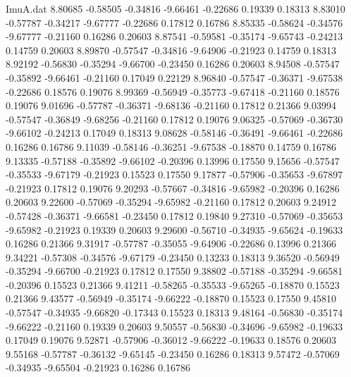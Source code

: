 \begin{filecontents}{ImuA.dat}
   8.80685   -0.58505   -0.34816   -9.66461   -0.22686    0.19339    0.18313
   8.83010   -0.57787   -0.34217   -9.67777   -0.22686    0.17812    0.16786
   8.85335   -0.58624   -0.34576   -9.67777   -0.21160    0.16286    0.20603
   8.87541   -0.59581   -0.35174   -9.65743   -0.24213    0.14759    0.20603
   8.89870   -0.57547   -0.34816   -9.64906   -0.21923    0.14759    0.18313
   8.92192   -0.56830   -0.35294   -9.66700   -0.23450    0.16286    0.20603
   8.94508   -0.57547   -0.35892   -9.66461   -0.21160    0.17049    0.22129
   8.96840   -0.57547   -0.36371   -9.67538   -0.22686    0.18576    0.19076
   8.99369   -0.56949   -0.35773   -9.67418   -0.21160    0.18576    0.19076
   9.01696   -0.57787   -0.36371   -9.68136   -0.21160    0.17812    0.21366
   9.03994   -0.57547   -0.36849   -9.68256   -0.21160    0.17812    0.19076
   9.06325   -0.57069   -0.36730   -9.66102   -0.24213    0.17049    0.18313
   9.08628   -0.58146   -0.36491   -9.66461   -0.22686    0.16286    0.16786
   9.11039   -0.58146   -0.36251   -9.67538   -0.18870    0.14759    0.16786
   9.13335   -0.57188   -0.35892   -9.66102   -0.20396    0.13996    0.17550
   9.15656   -0.57547   -0.35533   -9.67179   -0.21923    0.15523    0.17550
   9.17877   -0.57906   -0.35653   -9.67897   -0.21923    0.17812    0.19076
   9.20293   -0.57667   -0.34816   -9.65982   -0.20396    0.16286    0.20603
   9.22600   -0.57069   -0.35294   -9.65982   -0.21160    0.17812    0.20603
   9.24912   -0.57428   -0.36371   -9.66581   -0.23450    0.17812    0.19840
   9.27310   -0.57069   -0.35653   -9.65982   -0.21923    0.19339    0.20603
   9.29600   -0.56710   -0.34935   -9.65624   -0.19633    0.16286    0.21366
   9.31917   -0.57787   -0.35055   -9.64906   -0.22686    0.13996    0.21366
   9.34221   -0.57308   -0.34576   -9.67179   -0.23450    0.13233    0.18313
   9.36520   -0.56949   -0.35294   -9.66700   -0.21923    0.17812    0.17550
   9.38802   -0.57188   -0.35294   -9.66581   -0.20396    0.15523    0.21366
   9.41211   -0.58265   -0.35533   -9.65265   -0.18870    0.15523    0.21366
   9.43577   -0.56949   -0.35174   -9.66222   -0.18870    0.15523    0.17550
   9.45810   -0.57547   -0.34935   -9.66820   -0.17343    0.15523    0.18313
   9.48164   -0.56830   -0.35174   -9.66222   -0.21160    0.19339    0.20603
   9.50557   -0.56830   -0.34696   -9.65982   -0.19633    0.17049    0.19076
   9.52871   -0.57906   -0.36012   -9.66222   -0.19633    0.18576    0.20603
   9.55168   -0.57787   -0.36132   -9.65145   -0.23450    0.16286    0.18313
   9.57472   -0.57069   -0.34935   -9.65504   -0.21923    0.16286    0.16786

\end{filecontents}
